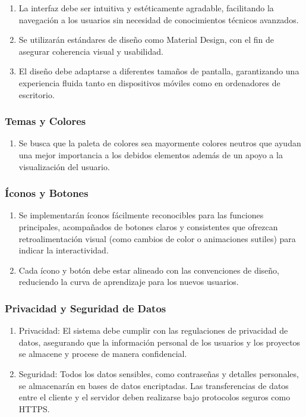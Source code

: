 	\begin{enumerate}
		\item La interfaz debe ser intuitiva y estéticamente agradable, facilitando la
			navegación a los usuarios sin necesidad de conocimientos técnicos avanzados.

		\item Se utilizarán estándares de diseño como Material Design, con el fin de
			asegurar coherencia visual y usabilidad.

		\item El diseño debe adaptarse a diferentes tamaños de pantalla, garantizando
			una experiencia fluida tanto en dispositivos móviles como en ordenadores de
			escritorio.
	\end{enumerate}

	\subsubsection{Temas y Colores}

	\begin{enumerate}
		\item Se busca que la paleta de colores sea mayormente colores neutros que ayudan
			una mejor importancia a los debidos elementos además de un apoyo a la visualización
			del usuario.
	\end{enumerate}

	\subsubsection{Íconos y Botones}

	\begin{enumerate}
		\item Se implementarán íconos fácilmente reconocibles para las funciones principales,
			acompañados de botones claros y consistentes que ofrezcan retroalimentación
			visual (como cambios de color o animaciones sutiles) para indicar la
			interactividad.

		\item Cada ícono y botón debe estar alineado con las convenciones de diseño,
			reduciendo la curva de aprendizaje para los nuevos usuarios.
	\end{enumerate}

	\subsubsection{Privacidad y Seguridad de Datos}

	\begin{enumerate}
		\item Privacidad: El sistema debe cumplir con las regulaciones de privacidad
			de datos, asegurando que la información personal de los usuarios y los proyectos
			se almacene y procese de manera confidencial.

		\item Seguridad: Todos los datos sensibles, como contraseñas y detalles personales,
			se almacenarán en bases de datos encriptadas. Las transferencias de datos entre
			el cliente y el servidor deben realizarse bajo protocolos seguros como HTTPS.
	\end{enumerate}

